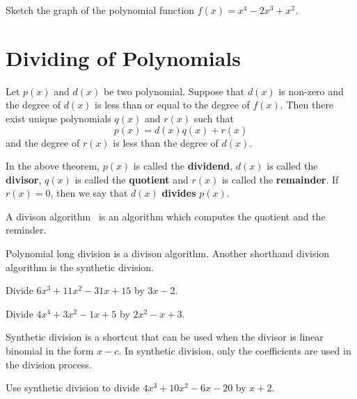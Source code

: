 \begin{exercise}
  Sketch the graph of the polynomial function $f(x)=x^{4} - 2 x^{3} + x^{2}$.
\end{exercise}

\newpage
\section{Dividing of Polynomials}

\begin{theorem}
  Let $p(x)$ and $d(x)$ be two polynomial. Suppose that \(d(x)\) is non-zero and the degree of \(d(x)\) is less than or equal to the degree of \(f(x)\). Then there exist unique polynomials \(q(x)\) and \(r(x)\) such that
  \[p(x)=d(x)q(x)+r(x)\]
and the degree of $r(x)$ is less than the degree of $d(x)$.
\end{theorem}
\begin{definition}
 In the above theorem, $p(x)$ is called the \textbf{dividend}, $d(x)$ is called the \textbf{divisor}, $q(x)$ is called the \textbf{quotient} and $r(x)$ is called the \textbf{remainder}.
 If $r(x)=0$, then we say that $d(x)$ \textbf{divides} $p(x)$.
 
 A divison algorithm\footnotemark~ is an algorithm which computes the quotient and the reminder. 

 Polynomial long division is a divison algorithm. Another shorthand division algorithm is the synthetic division. 
\end{definition}

\begin{example}
  Divide \(6x^3+11x^2-31x+15\) by \(3x-2\).
\end{example}

\begin{example}
  Divide \(4x^4+3x^2-1x+5\) by \(2x^2-x+3\).
\end{example}

\newpage
\begin{definition}
  Synthetic division is a shortcut that can be used when the divisor is linear binomial in the form $x-c$. In synthetic division, only the coefficients are used in the division process.
\end{definition}

\begin{example}
  Use synthetic division to divide $4x^3+10x^2-6x-20$ by $x+2$.
\end{example}

